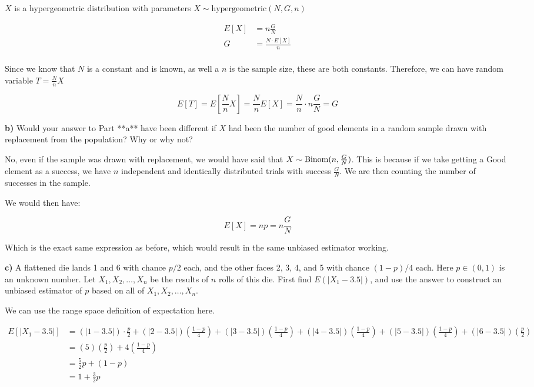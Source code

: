 \documentclass{report}
\begin{document}
$ X $ is a hypergeometric distribution with parameters $ X \sim \text{hypergeometric}(N, G, n) $ 

\begin{align*}
	E[X] &= n \frac{G}{N} \\
	G &= \frac{N\cdot E[X]}{n} \\
\end{align*}

Since we know that $ N $ is a constant and is known, as well a $ n $ is the sample size, these are both constants. Therefore, we can have random variable $ T = \frac{N}{n} X$ 

\[
	E[T] = E\left[\frac{N}{n} X \right] = \frac{N}{n}E[X] = \frac{N}{n} \cdot n \frac{G}{N} = G 
\]

\textbf{b)} Would your answer to Part **a** have been different if $X$ had been the number of good elements in a random sample drawn with replacement from the population? Why or why not?

No, even if the sample was drawn with replacement, we would have said that $ X \sim \operatorname{Binom}(n, \frac{G}{N}) $. This is because if we take getting a Good element as a success, we have $ n $ independent and identically distributed trials with success $ \frac{G}{N} $. We are then counting the number of successes in the sample.

We would then have:

\[
E[X] = np = n \frac{G}{N}
\]

Which is the exact same expression as before, which would result in the same unbiased estimator working. 



\textbf{c)} A flattened die lands 1 and 6 with chance $p/2$ each, and the other faces 2, 3, 4, and 5 with chance $(1-p)/4$ each. Here $p \in (0, 1)$ is an unknown number. Let $X_1, X_2, \ldots, X_n$ be the results of $n$ rolls of this die. First find $E(\vert X_1 - 3.5 \vert)$, and use the answer to construct an unbiased estimator of $p$ based on all of $X_1, X_2, \ldots, X_n$.

We can use the range space definition of expectation here. 

\begin{align*}
E[\vert X_1 - 3.5 \vert] &= (|1-3.5|) \cdot \frac{p}{2} + (|2-3.5|) (\frac{1-p}{4}) + (|3-3.5|) (\frac{1-p}{4}) + (|4-3.5|)(\frac{1-p}{4}) + (|5-3.5|)(\frac{1-p}{4}) + (|6-3.5|)(\frac{p}{2}) \\
&= (5)(\frac{p}{2}) + 4(\frac{1-p}{4})   \\
&= \frac{5}{2} p + (1-p) \\
&= 1 + \frac{3}{2}p \\
\end{align*}
\end{document}
